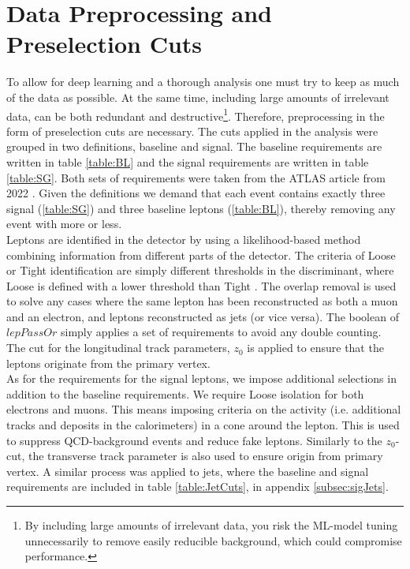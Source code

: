 \section{Data Preprocessing and Preselection Cuts}\label{subsec:Cuts}
To allow for deep learning and a thorough analysis one must try to keep
as much of the data as possible. At the same time, including large amounts
of irrelevant data, can be both redundant and destructive\footnote{By including 
large amounts of irrelevant data, you risk the \ac{ML}-model tuning unnecessarily 
to remove easily reducible background, which could compromise performance.}. 
Therefore, preprocessing in the form of preselection cuts are necessary. 
The cuts applied in the analysis were grouped in two definitions, baseline and signal. 
The baseline requirements are written in table \ref{table:BL} and the signal requirements are written 
in table \ref{table:SG}. Both sets of requirements were taken from the \ac{ATLAS} article from 2022 \cite{franchini_search_2019}.
Given the definitions we demand that each event contains exactly three signal (\ref{table:SG}) and 
three baseline leptons (\ref{table:BL}), thereby removing any event with more or less. 
\\
Leptons are identified in the detector by using a likelihood-based method combining
information from different parts of the detector. The criteria of Loose or Tight 
identification are simply different thresholds in the discriminant, where Loose is 
defined with a lower threshold than Tight \cite{Aaboud_2019}. The overlap removal is used to solve any cases
where the same lepton has been reconstructed as both a muon and an electron, and leptons reconstructed 
as jets (or vice versa). The boolean of $lepPassOr$ simply applies a set of requirements to avoid any double 
counting. The cut for the longitudinal track parameters, $z_0$ is applied to ensure that the leptons originate 
from the primary vertex.
\\
As for the requirements for the signal leptons, we impose additional selections in addition 
to the baseline requirements. We require Loose isolation for both electrons and muons. This means
imposing criteria on the activity (i.e. additional tracks and deposits in the calorimeters) in a cone around the lepton. 
This is used to suppress \ac{QCD}-background events and reduce fake leptons. Similarly to the $z_0$-cut, the transverse 
track parameter is also used to ensure origin from primary vertex. A similar process was applied to jets, where the baseline 
and signal requirements are included in table \ref{table:JetCuts}, in appendix \ref{subsec:sigJets}.
